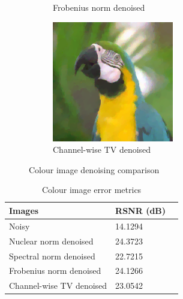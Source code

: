 \documentclass{article}
\begin{document}
\begin{figure}[ht]
\begin{subfigure}[b]{0.24\textwidth}
        \caption{Frobenius norm denoised}
        \label{fig:FrobeniusNormdenoised_colour}
    \end{subfigure}
    \begin{subfigure}[b]{0.24\textwidth}
        \centering
        \includegraphics[width=\textwidth]{../images/ChannelwiseTVdenoised_colour.png}
        \caption{Channel-wise TV denoised}
        \label{fig:ChannelwiseTVdenoised_colour}
    \end{subfigure}
    \vspace{.3cm}

    \caption{Colour image denoising comparison}
    \label{fig:colour_comparison}
\end{figure}

\begin{table}[ht]
    \centering
    \begin{tabular}{| l | l | l |} 
        \hline
        \textbf{Images} & \textbf{RSNR (dB)} \\ [0.5ex] 
        \hline\hline
        Noisy & 14.1294 \\ 
        \hline
        Nuclear norm denoised & 24.3723 \\
        \hline
        Spectral norm denoised & 22.7215 \\
        \hline
        Frobenius norm denoised & 24.1266 \\
        \hline
        Channel-wise TV denoised & 23.0542 \\
        \hline
    \end{tabular}
    \caption{Colour image error metrics}
    \label{tab:colour_metrics}
\end{table}
\end{document}

